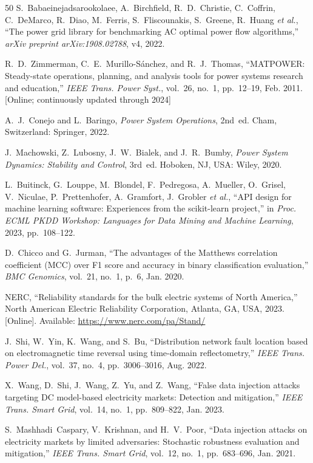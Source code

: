 \documentclass[journal]{IEEEtran}
\begin{document}
\begin{thebibliography}{50}
S.~Babaeinejadsarookolaee, A.~Birchfield, R.~D.~Christie, C.~Coffrin, C.~DeMarco, R.~Diao, M.~Ferris, S.~Fliscounakis, S.~Greene, R.~Huang \emph{et al.}, ``The power grid library for benchmarking AC optimal power flow algorithms,'' \textit{arXiv preprint arXiv:1908.02788}, v4, 2022.

R.~D.~Zimmerman, C.~E.~Murillo-S\'{a}nchez, and R.~J.~Thomas, ``MATPOWER: Steady-state operations, planning, and analysis tools for power systems research and education,'' \textit{IEEE Trans. Power Syst.}, vol.~26, no.~1, pp.~12--19, Feb. 2011. [Online; continuously updated through 2024]

A.~J.~Conejo and L.~Baringo, \textit{Power System Operations}, 2nd~ed. Cham, Switzerland: Springer, 2022.

J.~Machowski, Z.~Lubosny, J.~W.~Bialek, and J.~R.~Bumby, \textit{Power System Dynamics: Stability and Control}, 3rd~ed. Hoboken, NJ, USA: Wiley, 2020.

L.~Buitinck, G.~Louppe, M.~Blondel, F.~Pedregosa, A.~Mueller, O.~Grisel, V.~Niculae, P.~Prettenhofer, A.~Gramfort, J.~Grobler \emph{et al.}, ``API design for machine learning software: Experiences from the scikit-learn project,'' in \textit{Proc. ECML PKDD Workshop: Languages for Data Mining and Machine Learning}, 2023, pp.~108--122.

D.~Chicco and G.~Jurman, ``The advantages of the Matthews correlation coefficient (MCC) over F1 score and accuracy in binary classification evaluation,'' \textit{BMC Genomics}, vol.~21, no.~1, p.~6, Jan. 2020.

NERC, ``Reliability standards for the bulk electric systems of North America,'' North American Electric Reliability Corporation, Atlanta, GA, USA, 2023. [Online]. Available: \url{https://www.nerc.com/pa/Stand/}

J.~Shi, W.~Yin, K.~Wang, and S.~Bu, ``Distribution network fault location based on electromagnetic time reversal using time-domain reflectometry,'' \textit{IEEE Trans. Power Del.}, vol.~37, no.~4, pp.~3006--3016, Aug. 2022.

X.~Wang, D.~Shi, J.~Wang, Z.~Yu, and Z.~Wang, ``False data injection attacks targeting DC model-based electricity markets: Detection and mitigation,'' \textit{IEEE Trans. Smart Grid}, vol.~14, no.~1, pp.~809--822, Jan. 2023.

S.~Mashhadi~Caspary, V.~Krishnan, and H.~V.~Poor, ``Data injection attacks on electricity markets by limited adversaries: Stochastic robustness evaluation and mitigation,'' \textit{IEEE Trans. Smart Grid}, vol.~12, no.~1, pp.~683--696, Jan. 2021.


\end{thebibliography}
\end{document}
